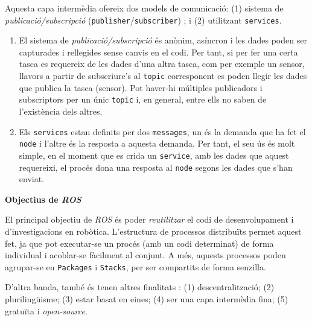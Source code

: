 \documentclass[12pt,a4paper,final,twoside]{article}
\begin{document}
Aquesta capa intermèdia ofereix dos models de comunicació: (1) sistema de \textit{publicació/subscripció} (\texttt{publisher}/\texttt{subscriber}) ; i (2) utilitzant \texttt{services}.

\begin{enumerate}

\item El sistema de \textit{publicació/subscripció} és anònim, asíncron i les dades poden ser capturades i rellegides sense canvis en el codi. Per tant, si per fer una certa tasca es requereix de les dades d'una altra tasca, com per exemple un sensor, llavors a partir de subscriure's al \texttt{topic} corresponent es poden llegir les dades que publica la tasca (sensor). Pot haver-hi múltiples publicadors i subscriptors per un únic \texttt{topic} i, en general, entre ells no saben de l'existència dels altres.

\item Els \texttt{services} estan definits per dos \texttt{messages}, un és la demanda que ha fet el \texttt{node} i l'altre és la resposta a aquesta demanda. Per tant, el seu ús és molt simple, en el moment que es crida un \texttt{service}, amb les dades que aquest requereixi, el procés dona una resposta al \texttt{node} segons les dades que s'han enviat.
\end{enumerate}


\vspace{20pt}
\textbf{Objectius de \textit{ROS}}

El principal objectiu de \textit{ROS} és poder \textit{reutilitzar} el codi de desenvolupament i d'investigacions en robòtica. L'estructura de processos distribuïts permet aquest fet, ja que pot executar-se un procés (amb un codi determinat) de forma individual i acoblar-se fàcilment al conjunt. A més, aquests processos poden agrupar-se en \texttt{Packages} i \texttt{Stacks}, per ser compartits de forma senzilla.

D'altra banda, també és tenen altres finalitats \cite{Quigley}: (1) descentralització; (2) plurilingüisme; (3) estar basat en eines; (4) ser una capa intermèdia fina; (5) gratuïta i \textit{open-source}.
\end{document}
